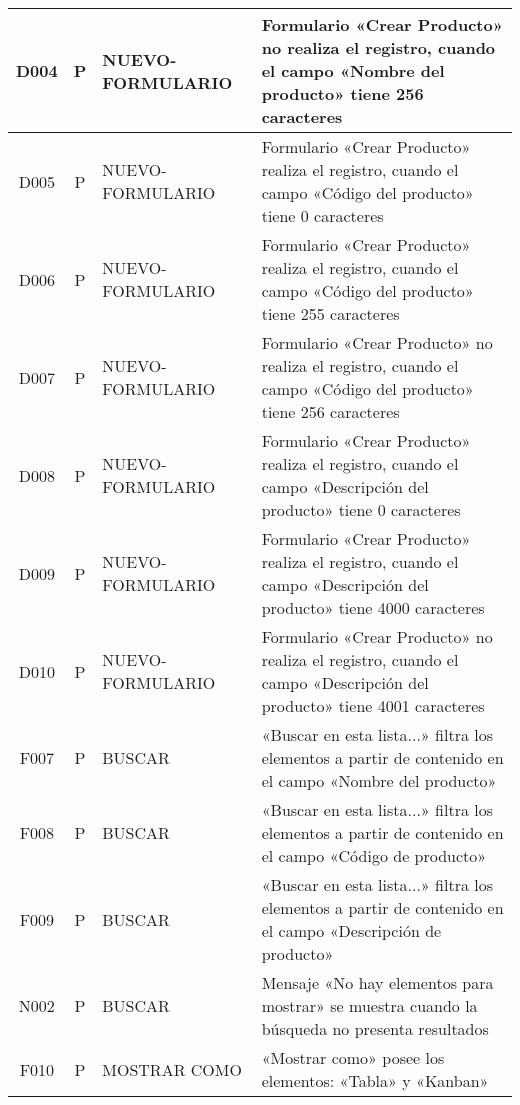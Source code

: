 \begin{landscape}
{\begin{longtable}[htb]{|c|c|p{3.8cm}|p{15.2cm}|}
\scriptsize{D004} & \scriptsize{P} & \scriptsize{NUEVO-FORMULARIO} & \scriptsize{Formulario «Crear Producto» no realiza el registro, cuando el campo «Nombre del producto» tiene 256 caracteres} \\ \hline
\scriptsize{D005} & \scriptsize{P} & \scriptsize{NUEVO-FORMULARIO} & \scriptsize{Formulario «Crear Producto» realiza el registro, cuando el campo «Código del producto» tiene 0 caracteres} \\ \hline
\scriptsize{D006} & \scriptsize{P} & \scriptsize{NUEVO-FORMULARIO} & \scriptsize{Formulario «Crear Producto» realiza el registro, cuando el campo «Código del producto» tiene 255 caracteres} \\ \hline
\scriptsize{D007} & \scriptsize{P} & \scriptsize{NUEVO-FORMULARIO} & \scriptsize{Formulario «Crear Producto» no realiza el registro, cuando el campo «Código del producto» tiene 256 caracteres} \\ \hline
\scriptsize{D008} & \scriptsize{P} & \scriptsize{NUEVO-FORMULARIO} & \scriptsize{Formulario «Crear Producto» realiza el registro, cuando el campo «Descripción del producto» tiene 0 caracteres} \\ \hline
\scriptsize{D009} & \scriptsize{P} & \scriptsize{NUEVO-FORMULARIO} & \scriptsize{Formulario «Crear Producto» realiza el registro, cuando el campo «Descripción del producto» tiene 4000 caracteres} \\ \hline
\scriptsize{D010} & \scriptsize{P} & \scriptsize{NUEVO-FORMULARIO} & \scriptsize{Formulario «Crear Producto» no realiza el registro, cuando el campo «Descripción del producto» tiene 4001 caracteres} \\ \hline
\scriptsize{F007} & \scriptsize{P} & \scriptsize{BUSCAR} & \scriptsize{«Buscar en esta lista...» filtra los elementos a partir de contenido en el campo «Nombre del producto»} \\ \hline
\scriptsize{F008} & \scriptsize{P} & \scriptsize{BUSCAR} & \scriptsize{«Buscar en esta lista...» filtra los elementos a partir de contenido en el campo «Código de producto»} \\ \hline
\scriptsize{F009} & \scriptsize{P} & \scriptsize{BUSCAR} & \scriptsize{«Buscar en esta lista...» filtra los elementos a partir de contenido en el campo «Descripción de producto»} \\ \hline
\scriptsize{N002} & \scriptsize{P} & \scriptsize{BUSCAR} & \scriptsize{Mensaje «No hay elementos para mostrar» se muestra cuando la búsqueda no presenta resultados} \\ \hline
\scriptsize{F010} & \scriptsize{P} & \scriptsize{MOSTRAR COMO} & \scriptsize{«Mostrar como» posee los elementos: «Tabla» y «Kanban»} \\ \hline

\end{longtable}}
\end{landscape}

